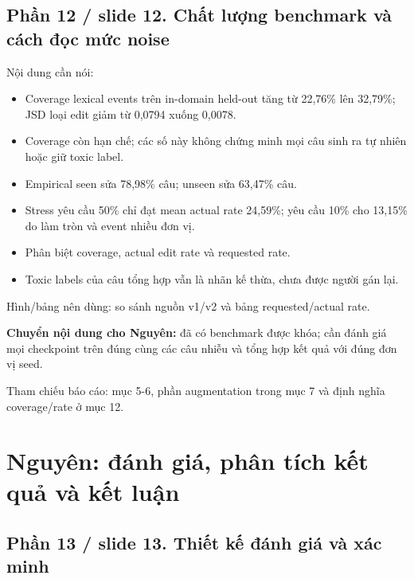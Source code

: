 \documentclass[11pt,a4paper]{article}
\begin{document}
\subsection*{Phần 12 / slide 12. Chất lượng benchmark và cách đọc mức noise}

Nội dung cần nói:


\begin{itemize}

\item Coverage lexical events trên in-domain held-out tăng từ 22,76\% lên 32,79\%; JSD loại edit giảm từ 0,0794 xuống 0,0078.

\item Coverage còn hạn chế; các số này không chứng minh mọi câu sinh ra tự nhiên hoặc giữ toxic label.

\item Empirical seen sửa 78,98\% câu; unseen sửa 63,47\% câu.

\item Stress yêu cầu 50\% chỉ đạt mean actual rate 24,59\%; yêu cầu 10\% cho 13,15\% do làm tròn và event nhiều đơn vị.

\item Phân biệt coverage, actual edit rate và requested rate.

\item Toxic labels của câu tổng hợp vẫn là nhãn kế thừa, chưa được người gán lại.

\end{itemize}

Hình/bảng nên dùng: so sánh nguồn v1/v2 và bảng requested/actual rate.


\textbf{Chuyển nội dung cho Nguyên:} đã có benchmark được khóa; cần đánh giá mọi checkpoint trên đúng cùng các câu nhiễu và tổng hợp kết quả với đúng đơn vị seed.


Tham chiếu báo cáo: mục 5-6, phần augmentation trong mục 7 và định nghĩa coverage/rate ở mục 12.


\FloatBarrier\section{Nguyên: đánh giá, phân tích kết quả và kết luận}

\subsection*{Phần 13 / slide 13. Thiết kế đánh giá và xác minh}
\end{document}
